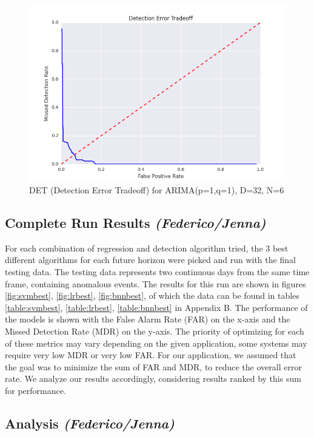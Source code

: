 \documentclass{acm_proc_article-sp}
\begin{document}
\begin{figure}[!h]
\centering
    \includegraphics[scale=0.4]{figures/det.png}
\caption{DET (Detection Error Tradeoff) for ARIMA(p=1,q=1), D=32, N=6} 
\label{fig:detexample}
\end{figure}

\subsection{Complete Run Results \textit{(Federico/Jenna)}}

For each combination of regression and detection algorithm tried, the 3 best different algorithms for each future horizon were picked and run with the final testing data. The testing data represents two continuous days from the same time frame, containing anomalous events. The results for this run are shown in figures \ref{fig:svmbest}, \ref{fig:lrbest}, \ref{fig:bnnbest}, of which the data can be found in tables \ref{table:svmbest}, \ref{table:lrbest}, \ref{table:bnnbest} in Appendix B. The performance of the models is shown with the False Alarm Rate (FAR) on the x-axis and the Missed Detection Rate (MDR) on the y-axis. The priority of optimizing for each of these metrics may vary depending on the given application, some systems may require very low MDR or very low FAR. For our application, we assumed that the goal was to minimize the sum of FAR and MDR, to reduce the overall error rate. We analyze our results accordingly, considering results ranked by this sum for performance.




\subsection{Analysis \textit{(Federico/Jenna)}}
\end{document}

